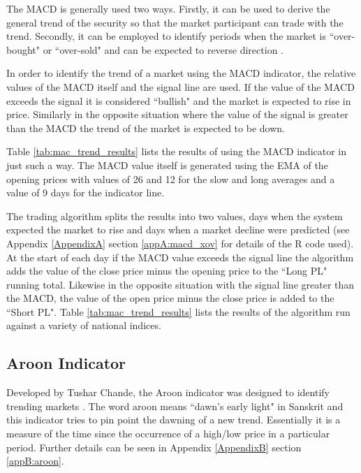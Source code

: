 The MACD is generally used two ways. Firstly, it can be used to derive the general trend of the security so that the market participant can trade with the trend. Secondly, it can be employed to identify periods when the market is \textquotedblleft over-bought" or \textquotedblleft over-sold" and can be expected to reverse direction \citep{MACD2}.

In order to identify the trend of a market using the MACD indicator, the relative values of the MACD itself and the signal line are used. If the value of the MACD exceeds the signal it is considered \textquotedblleft bullish" and the market is expected to rise in price. Similarly in the opposite situation where the value of the signal is greater than the MACD the trend of the market is expected to be down. 

Table \ref{tab:mac_trend_results} lists the results of using the MACD indicator in just such a way. The MACD value itself is generated using the EMA of the opening prices with values of 26 and 12 for the slow and long averages and a value of 9 days for the indicator line. 

The trading algorithm splits the results into two values, days when the system expected the market to rise and days when a market decline were predicted (see Appendix \ref{AppendixA} section \ref{appA:macd_xov} for details of the R code used). At the start of each day if the MACD value exceeds the signal line the algorithm adds the value of the close price minus the opening price to the \textquotedblleft Long PL" running total. Likewise in the opposite situation with the signal line greater than the MACD, the value of the open price minus the close price is added to the \textquotedblleft Short PL". Table \ref{tab:mac_trend_results} lists the results of the algorithm run against a variety of national indices.




\subsection{Aroon Indicator}
Developed by Tushar Chande, the Aroon indicator was designed to identify trending markets \citep{chande1994new}. The word aroon means \textquotedblleft dawn's early light" in Sanskrit and this indicator tries to pin point the dawning of a new trend.  Essentially it is a measure of the time since the occurrence of a high/low price in a particular period. Further details can be seen in Appendix \ref{AppendixB} section \ref{appB:aroon}.

